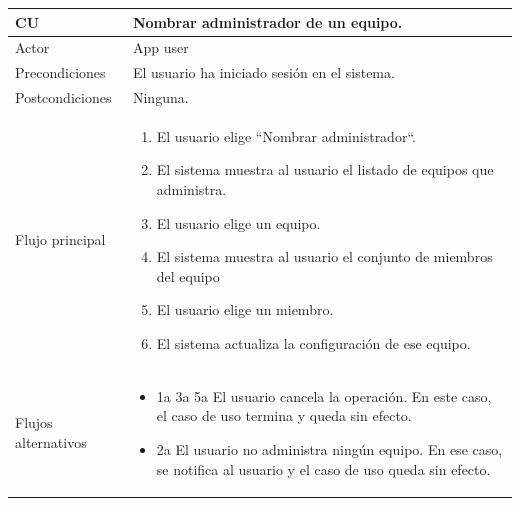 \documentclass[twoside]{report}
\newcommand\addrow[2]{#1 &#2\\ }
\newcommand\addheading[2]{#1 &#2\\ \hline}
\newcommand\tabularhead{\begin{tabular}{lp{0.7\textwidth}}
\hline
}
\newenvironment{usecase}{\tabularhead}
{\hline\end{tabular}}
\begin{document}
\begin{usecase}
  \addheading{\textbf{CU\arabic{usecase}}}{Nombrar administrador de un equipo.} 
  \addrow{Actor}{App user}
  \addrow{Precondiciones}{El usuario ha iniciado sesión en el sistema.}
  \addrow{Postcondiciones}{Ninguna.}
  \addrow{Flujo principal}{
  		\begin{enumerate}
  		\item El usuario elige “Nombrar administrador“. %
  		\item El sistema muestra al usuario el listado de equipos que administra. %
  		\item El usuario elige un equipo. %
  		\item El sistema muestra al usuario el conjunto de miembros del equipo %
  		\item El usuario elige un miembro. %
  		\item El sistema actualiza la configuración de ese equipo. %
  		\end{enumerate}
  }
  \addrow{Flujos alternativos}{
  		\begin{itemize}
  		\item 1a 3a 5a El usuario cancela la operación. En este caso, el caso de uso termina y queda sin efecto.
  		\item 2a El usuario no administra ningún equipo. En ese caso, se notifica al usuario y el caso de uso queda sin efecto.
  		\end{itemize}
  }
\end{usecase}\\

\vspace{0.5cm}
\end{document}
